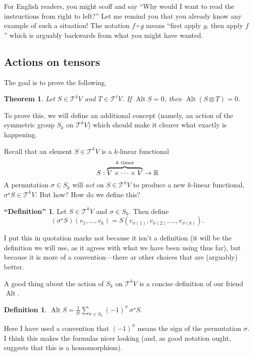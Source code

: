 \documentclass[12pt]{article}
\DeclareMathOperator{\Alt}{Alt}
\newtheorem*{theorem}{Theorem}
\theoremstyle{definition}
\newtheorem*{quotedefinition}{``Definition''}
\newtheorem*{definition}{Definition}
\newcommand{\Tensor}[2]{\mathcal{T}^{#2} #1}
\newcommand{\R}{\mathbb{R}}
\begin{document}
For English readers, you might scoff and say ``Why would I want to
read the instructions from right to left?''  Let me remind you that
you already know any example of such a situation!  The notation $f
\circ g$ means ``first apply $g$, then apply $f$'' which is arguably
backwards from what you might have wanted.

\subsection*{Actions on tensors}

The goal is to prove the following.
\begin{theorem}
  Let $S \in \Tensor{V}{k}$ and $T \in \Tensor{V}{\ell}$.  If $\Alt S
  = 0$, then $\Alt (S \otimes T) = 0$.
\end{theorem}
To prove this, we will define an additional concept (namely, an action
of the symmetric group $S_k$ on $\Tensor{V}{k}$) which should make it
clearer what exactly is happening.

Recall that an element $S \in \Tensor{V}{k}$ is a $k$-linear functional
$$
S : \overbrace{V \times \cdots \times V}^{\mbox{\scriptsize $k$ times}} \to \R
$$
A permutation $\sigma \in S_k$ will \textit{act} on $S \in
\Tensor{V}{k}$ to produce a new $k$-linear functional, $\sigma^\star S
\in \Tensor{V}{k}$.  But how?  How do we define this?
\begin{quotedefinition}
  Let $S \in \Tensor{V}{k}$ and $\sigma \in S_k$.  Then define
$$
\left(\sigma^\star S\right)\left(v_1,\ldots,v_k\right) =
S\left(v_{\sigma(1)}, v_{\sigma(2)}, \ldots, v_{\sigma(k)}\right).
$$
\end{quotedefinition}
I put this in quotation marks not because it isn't a definition (it
will be the definition we will use, as it agrees with what we have
been using thus far), but because it is more of a convention---there
ar other choices that are (arguably) better.

A good thing about the action of $S_k$ on $\Tensor{V}{k}$ is a
concise definition of our friend $\Alt$.
\begin{definition}
$\Alt S = \displaystyle\frac{1}{k!} \displaystyle\sum_{\sigma \in S_k} (-1)^{\sigma} \, \sigma^\star S$.
\end{definition}
Here I have used a convention that $(-1)^{\sigma}$ means the sign of
the permutation $\sigma$.  I think this makes the formulas nicer
looking (and, as good notation ought, suggests that this is a
homomorphism).
\end{document}
